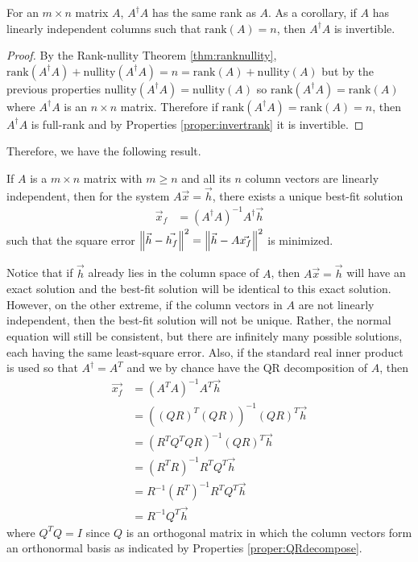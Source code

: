 \begin{proper}
For an $m \times n$ matrix $A$, $A^\dag A$ has the same rank as $A$. As a corollary, if $A$ has linearly independent columns such that $\text{rank}(A) = n$, then $A^\dag A$ is invertible.
\end{proper}
\begin{proof}
By the Rank-nullity Theorem \ref{thm:ranknullity}, $\text{rank}(A^\dag A) + \text{nullity}(A^\dag A) = n = \text{rank}(A) + \text{nullity}(A)$ but by the previous properties $\text{nullity}(A^\dag A) = \text{nullity}(A)$ so $\text{rank}(A^\dag A) = \text{rank}(A)$ where $A^\dag A$ is an $n \times n$ matrix. Therefore if $\text{rank}(A^\dag A) = \text{rank}(A) = n$, then $A^\dag A$ is full-rank and by Properties \ref{proper:invertrank} it is invertible.
\end{proof}
Therefore, we have the following result.
\begin{thm}
\label{thm:bestfit}
If $A$ is a $m \times n$ matrix with $m \geq n$ and all its $n$ column vectors are linearly independent, then for the system $A\vec{x} = \vec{h}$, there exists a unique best-fit solution
\begin{align*}
\vec{x}_f &= (A^\dag A)^{-1}A^\dag \vec{h}
\end{align*}
such that the square error $\norm{\vec{h}-\vec{h_f}}^2 = \norm{\vec{h}-A\vec{x_f}}^2$ is minimized.
\end{thm}
Notice that if $\vec{h}$ already lies in the column space of $A$, then $A\vec{x} = \vec{h}$ will have an exact solution and the best-fit solution will be identical to this exact solution. However, on the other extreme, if the column vectors in $A$ are not linearly independent, then the best-fit solution will not be unique. Rather, the normal equation will still be consistent, but there are infinitely many possible solutions, each having the same least-square error. Also, if the standard real inner product is used so that $A^\dag = A^T$ and we by chance have the QR decomposition of $A$, then
\begin{align*}
\vec{x_f} &= (A^TA)^{-1}A^T\vec{h} \\
&= ((QR)^T(QR))^{-1}(QR)^T\vec{h} \\
&= (R^TQ^TQR)^{-1} (QR)^T\vec{h} \\
&= (R^TR)^{-1} R^TQ^T \vec{h} \\
&= R^{-1} (R^T)^{-1} R^TQ^T \vec{h} \\
&= R^{-1} Q^T\vec{h}
\end{align*}
where $Q^TQ = I$ since $Q$ is an orthogonal matrix in which the column vectors form an orthonormal basis as indicated by Properties \ref{proper:QRdecompose}.

